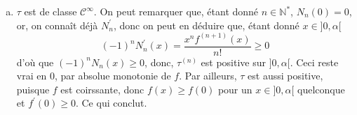 \documentclass[17pt]{article}
\def\N{\mathbb N}
\def\Cinf{\mathcal{C}^{\infty}}
\begin{document}
\begin{enumerate}
\begin{enumerate}[a)]
\begin{itemize}
				\item Soit $n\in\N$, supposons que $\mathcal P_n$ est vraie. Montrons $\mathcal P_{n+1}$. Comme $\tau$ est $\mathcal C^n$ sur $[0,\alpha[$, on a que $\tau^{(n)}$ est continue en $0$. D'autre part, d'après C.3.c, on a $\tau^{(n+1)}(x)\xrightarrow[\begin{smallmatrix}{c}x\to 0\\x\neq 0\end{smallmatrix}]{} \frac{f^{(n+2)}(0)}{n+2}$. $\tau^{(n)}$ est donc dérivable en $0$ d'après le théorème de la limite de la dérivée, et $\tau^{(n+1)}(0)=\frac{f^{(n+2)}(0)}{n+2}$. Comme $\tau^{(n)}$ est dérivable sur $]0,\alpha[$, $\tau^{(n)}$ est dérivable sur $[0,\alpha[$. De plus, $\tau^{(n+1)}$ est continue en $0$, ceci découle de l'application du théorème de limite de la dérivée, mais aussi sur $]0,\alpha[$ puisque $f$ est $\Cinf$.\\
				C'est exactement $\mathcal P_{n+1}$.
				\item Youpi!
			\end{itemize}
			\item $\tau$ est de classe $\Cinf$. On peut remarquer que, étant donné $n\in\N^*$, $N_n(0)=0$, or, on connaît déjà $N_n^\prime$, donc on peut en déduire que, étant donné $x\in]0,\alpha[$ \[(-1)^nN_n^\prime(x)=\frac{x^nf^{(n+1)}(x)}{n!}\geq 0\]
			d'où que $(-1)^nN_n(x)\geq 0$, donc, $\tau^{(n)}$ est positive sur $]0,\alpha[$. Ceci reste vrai en $0$, par absolue monotonie de $f$. Par ailleurs, $\tau$ est aussi positive, puisque $f$ est coirssante, donc $f(x)\geq f(0)$ pour un $x\in]0,\alpha[$ quelconque et $f^\prime(0)\geq 0$. Ce qui conclut.
		\end{enumerate}
	\end{enumerate}
\end{document}

